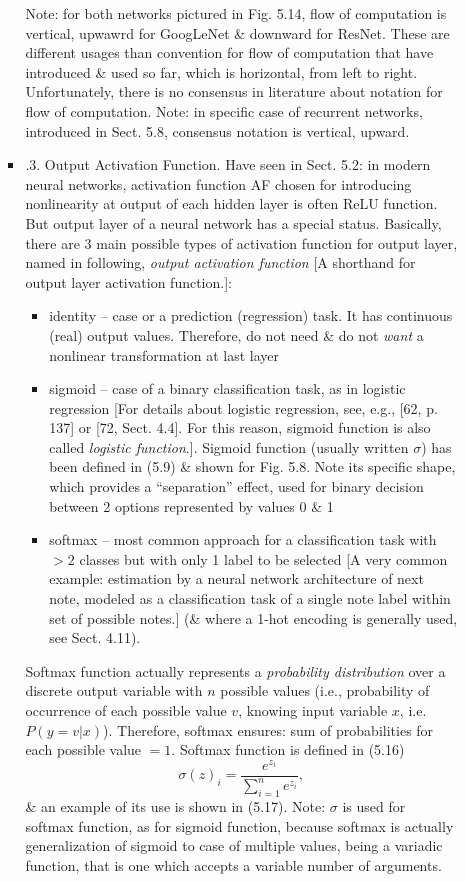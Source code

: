 \documentclass{article}
\begin{document}
\begin{itemize}
\begin{itemize}
\begin{itemize}
			Note: for both networks pictured in {\sf Fig. 5.14}, flow of computation is vertical, upwawrd for GoogLeNet \& downward for ResNet. These are different usages than convention for flow of computation that have introduced \& used so far, which is horizontal, from left to right. Unfortunately, there is no consensus in literature about notation for flow of computation. Note: in specific case of recurrent networks, introduced in Sect. 5.8, consensus notation is vertical, upward.
			\item {.3. Output Activation Function.} Have seen in Sect. 5.2: in modern neural networks, activation function AF chosen for introducing nonlinearity at output of each hidden layer is often ReLU function. But output layer of a neural network has a special status. Basically, there are 3 main possible types of activation function for output layer, named in following, {\it output activation function} [A shorthand for output layer activation function.]:
			\begin{itemize}
				\item identity -- case or a prediction (regression) task. It has continuous (real) output values. Therefore, do not need \& do not {\it want} a nonlinear transformation at last layer
				\item sigmoid -- case of a binary classification task, as in logistic regression [For details about logistic regression, see, e.g., [62, p. 137] or [72, Sect. 4.4]. For this reason, sigmoid function is also called {\it logistic function}.]. Sigmoid function (usually written $\sigma$) has been defined in (5.9) \& shown for {\sf Fig. 5.8}. Note its specific shape, which provides a ``separation'' effect, used for binary decision between 2 options represented by values 0 \& 1
				\item softmax -- most common approach for a classification task with $> 2$ classes but with only 1 label to be selected [A very common example: estimation by a neural network architecture of next note, modeled as a classification task of a single note label within set of possible notes.] (\& where a 1-hot encoding is generally used, see Sect. 4.11).
			\end{itemize}
			Softmax function actually represents a {\it probability distribution} over a discrete output variable with $n$ possible values (i.e., probability of occurrence  of each possible value $v$, knowing input variable $x$, i.e. $P(y = v|x)$). Therefore, softmax ensures: sum of probabilities for each possible value $= 1$. Softmax function is defined in (5.16)
			\begin{equation*}
				\sigma(z)_i = \frac{e^{z_i}}{\sum_{i=1}^n e^{z_i}},
			\end{equation*}
			\& an example of its use is shown in (5.17). Note: $\sigma$ is used for softmax function, as for sigmoid function, because softmax is actually generalization of sigmoid to case of multiple values, being a variadic function, that is one which accepts a variable number of arguments.
			

\end{itemize}
\end{itemize}
\end{itemize}
\end{document}
